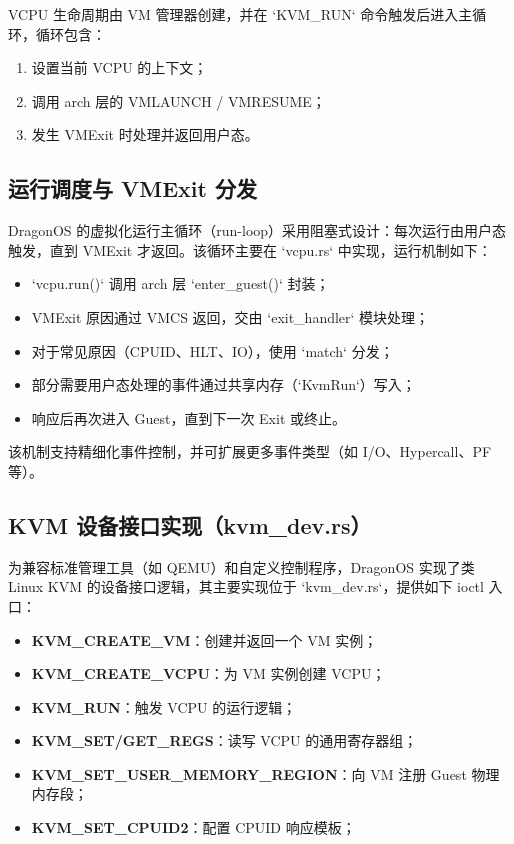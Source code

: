 \documentclass[analyze]{mancls}
\begin{document}
VCPU 生命周期由 VM 管理器创建，并在 `KVM\_RUN` 命令触发后进入主循环，循环包含：
\begin{enumerate}
    \item 设置当前 VCPU 的上下文；
    \item 调用 arch 层的 VMLAUNCH / VMRESUME；
    \item 发生 VMExit 时处理并返回用户态。
\end{enumerate}

\subsection{运行调度与 VMExit 分发}
DragonOS 的虚拟化运行主循环（run-loop）采用阻塞式设计：每次运行由用户态触发，直到 VMExit 才返回。该循环主要在 `vcpu.rs` 中实现，运行机制如下：

\begin{itemize}
    \item `vcpu.run()` 调用 arch 层 `enter\_guest()` 封装；
    \item VMExit 原因通过 VMCS 返回，交由 `exit\_handler` 模块处理；
    \item 对于常见原因（CPUID、HLT、IO），使用 `match` 分发；
    \item 部分需要用户态处理的事件通过共享内存（`KvmRun`）写入；
    \item 响应后再次进入 Guest，直到下一次 Exit 或终止。
\end{itemize}

该机制支持精细化事件控制，并可扩展更多事件类型（如 I/O、Hypercall、PF 等）。

\subsection{KVM 设备接口实现（kvm\_dev.rs）}
为兼容标准管理工具（如 QEMU）和自定义控制程序，DragonOS 实现了类 Linux KVM 的设备接口逻辑，其主要实现位于 `kvm\_dev.rs`，提供如下 ioctl 入口：

\begin{itemize}
    \item \textbf{KVM\_CREATE\_VM}：创建并返回一个 VM 实例；
    \item \textbf{KVM\_CREATE\_VCPU}：为 VM 实例创建 VCPU；
    \item \textbf{KVM\_RUN}：触发 VCPU 的运行逻辑；
    \item \textbf{KVM\_SET/GET\_REGS}：读写 VCPU 的通用寄存器组；
    \item \textbf{KVM\_SET\_USER\_MEMORY\_REGION}：向 VM 注册 Guest 物理内存段；
    \item \textbf{KVM\_SET\_CPUID2}：配置 CPUID 响应模板；
\end{itemize}
\end{document}
